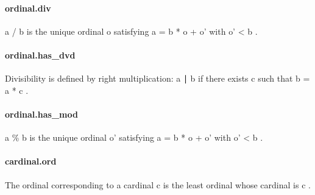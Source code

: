 \documentclass{article}
\begin{document}
\paragraph{ordinal.div}
\par
\colorbox[RGB]{253,246,227}{{{{\color[RGB]{101, 123, 131} a  }}}{{{\color[RGB]{181, 137, 0} / }}}{{{\color[RGB]{101, 123, 131}  b }}}} is the unique ordinal 
\colorbox[RGB]{253,246,227}{{{{\color[RGB]{101, 123, 131} o }}}} satisfying
\colorbox[RGB]{253,246,227}{{{{\color[RGB]{101, 123, 131} a  }}}{{{\color[RGB]{181, 137, 0} = }}}{{{\color[RGB]{101, 123, 131}  b  }}}{{{\color[RGB]{181, 137, 0} * }}}{{{\color[RGB]{101, 123, 131}  o  }}}{{{\color[RGB]{181, 137, 0} + }}}{{{\color[RGB]{101, 123, 131}  o' }}}} with 
\colorbox[RGB]{253,246,227}{{{{\color[RGB]{101, 123, 131} o'  }}}{{{\color[RGB]{181, 137, 0} < }}}{{{\color[RGB]{101, 123, 131}  b }}}}.
\paragraph{ordinal.has\_dvd}
\par
Divisibility is defined by right multiplication:
\colorbox[RGB]{253,246,227}{{{{\color[RGB]{101, 123, 131} a ∣ b }}}} if there exists 
\colorbox[RGB]{253,246,227}{{{{\color[RGB]{101, 123, 131} c }}}} such that 
\colorbox[RGB]{253,246,227}{{{{\color[RGB]{101, 123, 131} b  }}}{{{\color[RGB]{181, 137, 0} = }}}{{{\color[RGB]{101, 123, 131}  a  }}}{{{\color[RGB]{181, 137, 0} * }}}{{{\color[RGB]{101, 123, 131}  c }}}}.
\paragraph{ordinal.has\_mod}
\par
\colorbox[RGB]{253,246,227}{{{{\color[RGB]{101, 123, 131} a \% b }}}} is the unique ordinal 
\colorbox[RGB]{253,246,227}{{{{\color[RGB]{101, 123, 131} o' }}}} satisfying
\colorbox[RGB]{253,246,227}{{{{\color[RGB]{101, 123, 131} a  }}}{{{\color[RGB]{181, 137, 0} = }}}{{{\color[RGB]{101, 123, 131}  b  }}}{{{\color[RGB]{181, 137, 0} * }}}{{{\color[RGB]{101, 123, 131}  o  }}}{{{\color[RGB]{181, 137, 0} + }}}{{{\color[RGB]{101, 123, 131}  o' }}}} with 
\colorbox[RGB]{253,246,227}{{{{\color[RGB]{101, 123, 131} o'  }}}{{{\color[RGB]{181, 137, 0} < }}}{{{\color[RGB]{101, 123, 131}  b }}}}.
\paragraph{cardinal.ord}
\par
The ordinal corresponding to a cardinal 
\colorbox[RGB]{253,246,227}{{{{\color[RGB]{101, 123, 131} c }}}} is the least ordinal
whose cardinal is 
\colorbox[RGB]{253,246,227}{{{{\color[RGB]{101, 123, 131} c }}}}.
\end{document}
